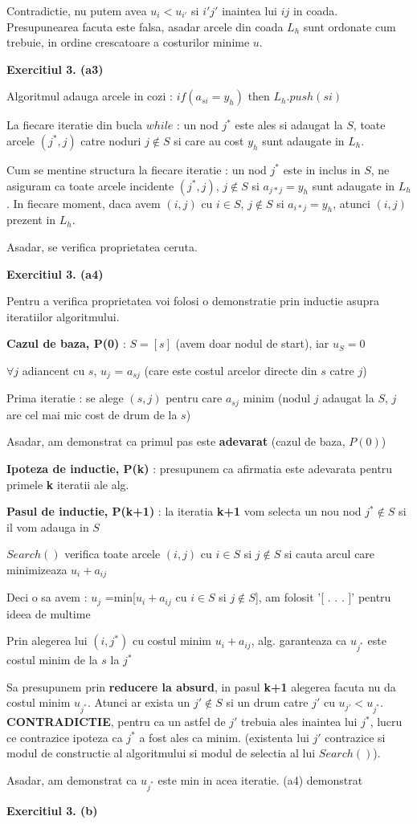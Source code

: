 \documentclass{article}
\begin{document}
Contradictie, nu putem avea $u_i < u_{i'}$ si $i'j'$ inaintea lui $ij$ in coada.
Presupunearea facuta este falsa, asadar arcele din coada $L_h$ sunt ordonate cum trebuie, in ordine crescatoare a costurilor minime $u$.

\textbf{Exercitiul 3. (a3) }

Algoritmul adauga arcele in cozi : $if (a_{si} = y_h)$ then $L_h.push(si)$

La fiecare iteratie din bucla $while$ : un nod $j^*$ este ales si adaugat la $S$, toate arcele $(j^*,j)$ catre noduri $j \notin S$ si care au cost $y_h$ sunt adaugate in $L_h$.

Cum se mentine structura la fiecare iteratie : un nod $j^*$ este in inclus in $S$, ne asiguram ca toate arcele incidente $(j^*,j)$, $j \notin S$ si $a_{j*j} = y_h$ sunt adaugate in $L_h$. In fiecare moment, daca avem $(i,j)$ cu $i \in S$, $j \notin S$ si $a_{i*j} = y_h$, atunci $(i,j)$ prezent in $L_h$.

Asadar, se verifica proprietatea ceruta.

\textbf{Exercitiul 3. (a4) }

Pentru a verifica proprietatea voi folosi o demonstratie prin inductie asupra iteratiilor algoritmului.

\textbf{Cazul de baza, P(0)} : $S=[s]$ (avem doar nodul de start), iar $u_S=0$

$\forall j$ adiancent cu $s$, $u_j$ = $a_{sj}$ (care este costul arcelor directe din $s$ catre $j$)

Prima iteratie : se alege $(s,j)$ pentru care $a_{sj}$ minim (nodul $j$ adaugat la $S$, $j$ are cel mai mic cost de drum de la $s$)

Asadar, am demonstrat ca primul pas este \textbf{adevarat} (cazul de baza, $P(0)$)

\textbf{Ipoteza de inductie, P(k)} : presupunem ca afirmatia este adevarata pentru primele \textbf{k} iteratii ale alg.

\textbf{Pasul de inductie, P(k+1)} : la iteratia \textbf{k+1} vom selecta un nou nod $j^* \notin S$ si il vom adauga in $S$

$Search()$ verifica toate arcele $(i,j)$ cu $i \in S$ si $j \notin S$ si cauta arcul care minimizeaza $u_i + a_{ij}$

Deci o sa avem : $u_j$ =min[$u_i+a_{ij}$ cu $i \in S$ si $j \notin S$], am folosit '[ . . . ]' pentru ideea de multime

Prin alegerea lui $(i,j^*)$ cu costul minim $u_i + a_{ij}$, alg. garanteaza ca $u_{j^*}$ este costul minim de la $s$ la $j^*$

Sa presupunem prin \textbf{reducere la absurd}, in pasul \textbf{k+1} alegerea facuta nu da costul minim $u_{j^*}$. Atunci ar exista un $j' \notin S$ si un drum catre $j'$ cu $u_{j'} < u_{j^*}$. \textbf{CONTRADICTIE}, pentru ca un astfel de $j'$ trebuia ales inaintea lui $j^*$, lucru ce contrazice ipoteza ca $j^*$ a fost ales ca minim. (existenta lui $j'$ contrazice si modul de constructie al algoritmului si modul de selectia al lui $Search()$).

Asadar, am demonstrat ca $u_{j^*}$ este min in acea iteratie. (a4) demonstrat

\textbf{Exercitiul 3. (b) }
\end{document}
